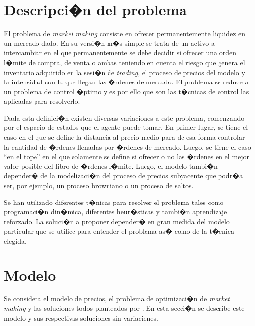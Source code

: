 \documentclass[12pt,a4paper,spanish]{article}%
\begin{document}
\section {Descripci�n del problema} \label{sec:problema}

El problema de \textit{market making} consiste en ofrecer permanentemente liquidez en un mercado dado. En su versi�n m�s simple se trata de un activo a intercambiar en el que permanentemente se debe decidir si ofrecer una orden l�mite de compra, de venta o ambas teniendo en cuenta el riesgo que genera el inventario adquirido en la sesi�n de \textit{trading}, el proceso de precios del modelo y la intensidad con la que llegan las �rdenes de mercado. El problema se reduce a un problema de control �ptimo y es por ello que son las t�cnicas de control las aplicadas para resolverlo.

Dada esta definici�n existen diversas variaciones a este problema, comenzando por el espacio de estados que el agente puede tomar. En primer lugar, se tiene el caso en el que se define la distancia al precio medio para de esa forma controlar la cantidad de �rdenes llenadas por �rdenes de mercado. Luego, se tiene el caso ``en el tope'' en el que solamente se define si ofrecer o no las �rdenes en el mejor valor posible del libro de �rdenes l�mite. Luego, el modelo tambi�n depender� de la modelizaci�n del proceso de precios subyacente que podr�a ser, por ejemplo, un proceso browniano o un proceso de saltos.

Se han utilizado diferentes t�nicas para resolver el problema tales como programaci�n din�mica, diferentes heur�sticas y tambi�n aprendizaje reforzado. La soluci�n a proponer depender� en gran medida del modelo particular que se utilice para entender el problema as� como de la t�cnica elegida.

\section {Modelo} \label{sec:modelo} %

Se considera el modelo de precios, el problema de optimizaci�n de \textit{market making} y las soluciones todos planteados por \cite{Cartea2019}. En esta secci�n se describe este modelo y sus respectivas soluciones sin variaciones.
\end{document}
